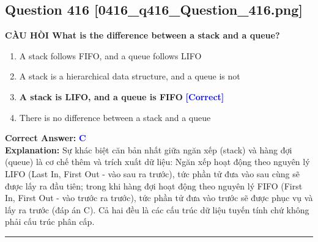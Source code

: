 \documentclass[11pt,a4paper]{article}
\begin{document}
\begin{minipage}{\textwidth}
\subsection*{Question 416 \quad \footnotesize{[0416\_q416\_Question\_416.png]}}
\noindent \textbf{CÀU HÒI What is the difference between a stack and a queue?}

\begin{enumerate}[label=\Alph*.]
    \item A stack follows FIFO, and a queue follows LIFO
    \item A stack is a hierarchical data structure, and a queue is not
    \item \textbf{A stack is LIFO, and a queue is FIFO} \hfill \textcolor{blue}{\textbf{[Correct]}}
    \item There is no difference between a stack and a queue
\end{enumerate}

\noindent \textbf{Correct Answer:} \textcolor{blue}{\textbf{C}} \\[2pt]
\noindent \textbf{Explanation:} Sự khác biệt căn bản nhất giữa ngăn xếp (stack) và hàng đợi (queue) là cơ chế thêm và trích xuất dữ liệu: Ngăn xếp hoạt động theo nguyên lý LIFO (Last In, First Out - vào sau ra trước), tức phần tử đưa vào sau cùng sẽ được lấy ra đầu tiên; trong khi hàng đợi hoạt động theo nguyên lý FIFO (First In, First Out - vào trước ra trước), tức phần tử đưa vào trước sẽ được phục vụ và lấy ra trước (đáp án C). Cả hai đều là các cấu trúc dữ liệu tuyến tính chứ không phải cấu trúc phân cấp.

\par\vspace{0.3cm}
\hrule
\vspace{0.3cm}
\end{minipage}
\end{document}
